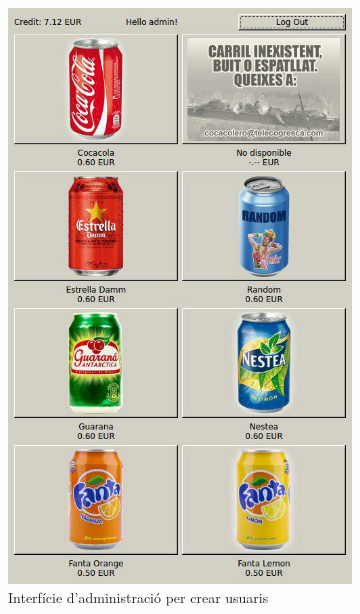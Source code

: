 \begin{figure}[H]
	\centering
	\begin{subfigure}[b]{0.45\textwidth}
		\includegraphics[width=\textwidth]{images/client_app1}
		\caption{Interfície d'administració per crear usuaris}
		\label{fig:admin1}
	\end{subfigure}
	\hspace{0.5cm}
	\begin{subfigure}[b]{0.45\textwidth}

\end{subfigure}
\end{figure}
